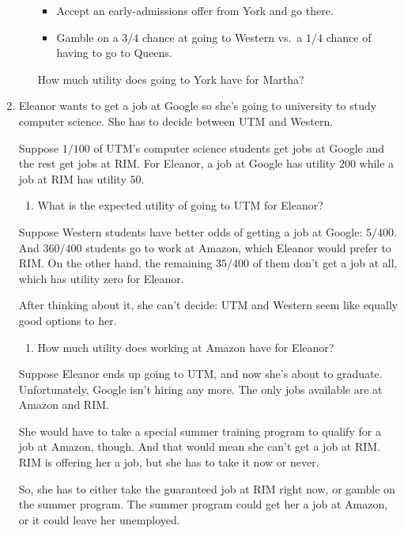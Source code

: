 \documentclass[justified]{tufte-book}
\providecommand{\tightlist}{%
  \setlength{\itemsep}{0pt}\setlength{\parskip}{0pt}}
\theoremstyle{definition}
\theoremstyle{definition}
\theoremstyle{definition}
\theoremstyle{remark}
\begin{document}
\begin{enumerate}
\begin{enumerate}
    \begin{itemize}
    \tightlist
    \item
      Accept an early-admissions offer from York and go there.
    \item
      Gamble on a \(3/4\) chance at going to Western vs.~a \(1/4\) chance of having to go to Queens.
    \end{itemize}

    How much utility does going to York have for Martha?
  \end{enumerate}
\item
  Eleanor wants to get a job at Google so she's going to university to study computer science. She has to decide between UTM and Western.

  Suppose \(1/100\) of UTM's computer science students get jobs at Google and the rest get jobs at RIM. For Eleanor, a job at Google has utility \(200\) while a job at RIM has utility \(50\).

  \begin{enumerate}
  \def\labelenumii{\alph{enumii}.}
  \tightlist
  \item
    What is the expected utility of going to UTM for Eleanor?
  \end{enumerate}

  Suppose Western students have better odds of getting a job at Google: \(5/400\). And \(360/400\) students go to work at Amazon, which Eleanor would prefer to RIM. On the other hand, the remaining \(35/400\) of them don't get a job at all, which has utility zero for Eleanor.

  After thinking about it, she can't decide: UTM and Western seem like equally good options to her.

  \begin{enumerate}
  \def\labelenumii{\alph{enumii}.}
  \setcounter{enumii}{1}
  \tightlist
  \item
    How much utility does working at Amazon have for Eleanor?
  \end{enumerate}

  Suppose Eleanor ends up going to UTM, and now she's about to graduate. Unfortunately, Google isn't hiring any more. The only jobs available are at Amazon and RIM.

  She would have to take a special summer training program to qualify for a job at Amazon, though. And that would mean she can't get a job at RIM. RIM is offering her a job, but she has to take it now or never.

  So, she has to either take the guaranteed job at RIM right now, or gamble on the summer program. The summer program could get her a job at Amazon, or it could leave her unemployed.


\end{enumerate}
\end{document}
